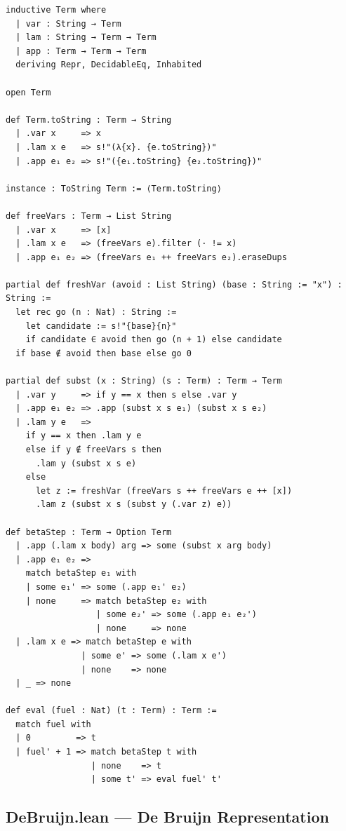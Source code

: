 \documentclass[11pt,a4paper]{article}
\theoremstyle{definition}
\begin{document}
\begin{verbatim}
inductive Term where
  | var : String → Term
  | lam : String → Term → Term
  | app : Term → Term → Term
  deriving Repr, DecidableEq, Inhabited

open Term

def Term.toString : Term → String
  | .var x     => x
  | .lam x e   => s!"(λ{x}. {e.toString})"
  | .app e₁ e₂ => s!"({e₁.toString} {e₂.toString})"

instance : ToString Term := ⟨Term.toString⟩

def freeVars : Term → List String
  | .var x     => [x]
  | .lam x e   => (freeVars e).filter (· != x)
  | .app e₁ e₂ => (freeVars e₁ ++ freeVars e₂).eraseDups

partial def freshVar (avoid : List String) (base : String := "x") : String :=
  let rec go (n : Nat) : String :=
    let candidate := s!"{base}{n}"
    if candidate ∈ avoid then go (n + 1) else candidate
  if base ∉ avoid then base else go 0

partial def subst (x : String) (s : Term) : Term → Term
  | .var y     => if y == x then s else .var y
  | .app e₁ e₂ => .app (subst x s e₁) (subst x s e₂)
  | .lam y e   =>
    if y == x then .lam y e
    else if y ∉ freeVars s then
      .lam y (subst x s e)
    else
      let z := freshVar (freeVars s ++ freeVars e ++ [x])
      .lam z (subst x s (subst y (.var z) e))

def betaStep : Term → Option Term
  | .app (.lam x body) arg => some (subst x arg body)
  | .app e₁ e₂ =>
    match betaStep e₁ with
    | some e₁' => some (.app e₁' e₂)
    | none     => match betaStep e₂ with
                  | some e₂' => some (.app e₁ e₂')
                  | none     => none
  | .lam x e => match betaStep e with
               | some e' => some (.lam x e')
               | none    => none
  | _ => none

def eval (fuel : Nat) (t : Term) : Term :=
  match fuel with
  | 0         => t
  | fuel' + 1 => match betaStep t with
                 | none    => t
                 | some t' => eval fuel' t'
\end{verbatim}

\subsection*{DeBruijn.lean --- De Bruijn Representation}
\end{document}
